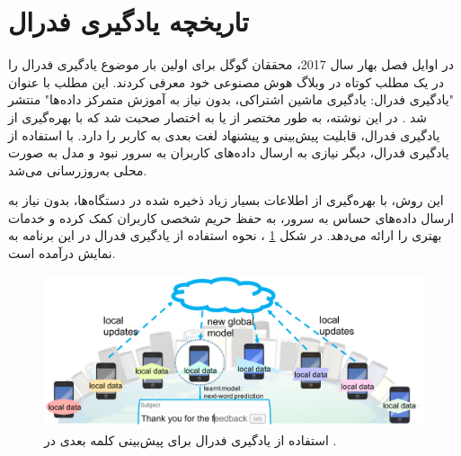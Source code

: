 \section{تاریخچه یادگیری فدرال}


در اوایل فصل بهار سال 2017، محققان گوگل
برای اولین بار موضوع یادگیری فدرال را در یک مطلب کوتاه در وبلاگ هوش مصنوعی خود معرفی کردند. این مطلب با عنوان "یادگیری فدرال: یادگیری ماشین اشتراکی، بدون نیاز به آموزش متمرکز داده‌ها" منتشر شد
\cite{mcmahan2017federated}.
در این نوشته، به طور مختصر از
یا به اختصار
صحبت شد که با بهره‌گیری از یادگیری فدرال، قابلیت پیش‌بینی و پیشنهاد لغت بعدی به کاربر را دارد. با استفاده از یادگیری فدرال، دیگر نیازی به ارسال داده‌های کاربران به سرور نبود و مدل به ‌صورت محلی به‌روزرسانی می‌شد.

این روش، با بهره‌گیری از اطلاعات بسیار زیاد ذخیره شده در دستگاه‌ها، بدون نیاز به ارسال داده‌های حساس به سرور، به حفظ حریم شخصی کاربران کمک کرده و خدمات بهتری را ارائه می‌دهد. در شکل
\ref{gboard}%
، نحوه استفاده از یادگیری فدرال در این برنامه به نمایش درآمده است.



 \begin{figure}[t]
	\centering
	\includegraphics[scale=1]{images/chap1/gboard.png}%
	\caption{%
استفاده از یادگیری فدرال برای پیش‌بینی کلمه بعدی در
		\cite{li2020federated}%
		.
	}
	\label{gboard}
	\centering
\end{figure}



